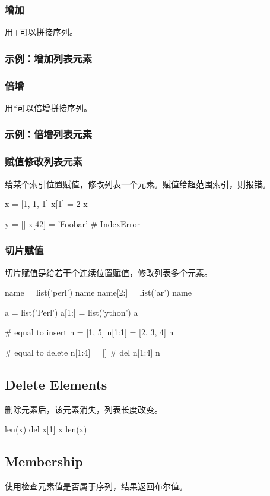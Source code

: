 \subsubsection{增加}
用+可以拼接序列。
\subsubsection{示例：增加列表元素}
\subsubsection{倍增}
用*可以倍增拼接序列。
\subsubsection{示例：倍增列表元素}
\subsubsection{赋值修改列表元素}
给某个索引位置赋值，修改列表一个元素。赋值给超范围索引，则报错。
\begin{python}
x = [1, 1, 1]
x[1] = 2
x

y = []
x[42] = 'Foobar'  #  IndexError
\end{python}
\subsubsection{切片赋值}
切片赋值是给若干个连续位置赋值，修改列表多个元素。
\begin{python}
name = list('perl')
name
name[2:] = list('ar')
name

a = list('Perl')
a[1:] = list('ython')
a

# equal to insert 
n = [1, 5]
n[1:1] = [2, 3, 4]
n

# equal to delete
n[1:4] = [] # del n[1:4]
n
\end{python}
\subsection{Delete Elements}
删除元素后，该元素消失，列表长度改变。
\begin{python}
len(x)
del x[1]
x
len(x)
\end{python}
\subsection{Membership}
使用检查元素值是否属于序列，结果返回布尔值。
